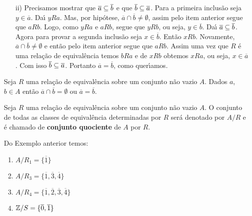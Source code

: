 \documentclass{beamer}
\begin{document}
        \begin{frame}
            \begin{enumerate}
                \item[ii)] Precisamos mostrar que \pause $\overline{a} \subseteq \overline{b}$ \pause e que $\overline{b} \subseteq \overline{a}$. \pause Para a primeira inclus\~ao seja \pause $y \in \overline{a}$. \pause Da{\'\i} $yRa$. \pause Mas, por hip\'otese, \pause $\overline{a}\cap\overline{b}\neq\emptyset$, \pause assim pelo item anterior \pause segue que $aRb$. \pause Logo, como $yRa$ e $aRb$, \pause segue que $yRb$, \pause ou seja, $y \in \overline{b}$. \pause Da{\'\i} $\overline{a}\subseteq\overline{b}$. \pause Agora para provar a segunda inclus\~ao \pause seja $x \in \overline{b}$. \pause Ent\~ao $xRb$. \pause Novamente, $\overline{a} \cap \overline{b} \ne \emptyset$ \pause e ent\~ao pelo item anterior \pause segue que $aRb$. \pause Assim uma vez que $R$ \'e uma rela\c{c}\~ao de equival\^encia \pause temos $bRa$ \pause e de $xRb$ \pause obtemos $xRa$, \pause ou seja, $x \in \overline{a}$. \pause Com isso $\overline{b} \subseteq \overline{a}$. \pause Portanto $\overline{a} = \overline{b}$, \pause como quer{\'\i}amos. \hspace{.2cm} \qedsymbol\pause
            \end{enumerate}
        \vspace{.5cm}
        \begin{corolario}
            Seja $R$ uma rela\c{c}\~ao de equival\^encia sobre um conjunto n\~ao vazio $A$. \pause Dados $a$, $b \in A$ \pause ent\~ao $\overline{a} \cap \overline{b} = \emptyset$ \pause ou $\overline{a} = \overline{b}$.\pause
        \end{corolario}
    \end{frame}

    \begin{frame}
        \begin{definicao}
            Seja $R$ uma rela\c{c}\~ao de equival\^encia sobre um conjunto n\~ao vazio $A$. \pause O conjunto de todas as classes de equival{\^e}ncia \pause determinadas por $R$ ser{\'a} \pause denotado por $A/R$ \pause e {\'e} chamado de \textbf{conjunto quociente} de $A$ por $R$.\pause
        \end{definicao}

        \begin{exemplos}
            Do Exemplo anterior temos:\pause
            \begin{enumerate}[label={\arabic*})]
                \item $A/R_1 = \{\overline{1}\}$\pause \vspace{.3cm}
                \item $A/R_3 = \{\overline{1},\overline{3},\overline{4}\}$ \pause \vspace{.3cm}
                \item $A/R_4 = \{\overline{1},\overline{2},\overline{3},\overline{4}\}$ \pause \vspace{.3cm}
                \item $\mathbb{Z}/S = \{\overline{0},\overline{1}\}$\pause
            \end{enumerate}
        \end{exemplos}
    \end{frame}
\end{document}
